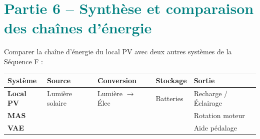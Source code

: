 \documentclass[a4paper, 11pt, oneside]{article}
\begin{document}
\newpage

\section{\textcolor{teal}{Partie 6 -- Synthèse et comparaison des chaînes d'énergie}}

Comparer la chaîne d'énergie du local PV avec deux autres systèmes de la Séquence F :

\vspace{0.6cm}

\begin{tcolorbox}[colback=grisclair, colframe=bleucol, title=\textcolor{bleucol}{\textbf{Tableau comparatif}}]
\small
\renewcommand{\arraystretch}{1.6}
\begin{tabular}{|p{2.2cm}|p{2.5cm}|p{2.5cm}|p{2cm}|p{2.5cm}|}
\hline
\textbf{Système} & \textbf{Source} & \textbf{Conversion} & \textbf{Stockage} & \textbf{Sortie} \\
\hline
\textbf{Local PV} & Lumière solaire & Lumière $\rightarrow$ Élec & Batteries & Recharge / Éclairage \\
\hline
\textbf{MAS} & \underline{\hspace{1.8cm}} & \underline{\hspace{1.8cm}} & \underline{\hspace{1.8cm}} & Rotation moteur \\[10pt]
\hline
\textbf{VAE} & \underline{\hspace{1.8cm}} & \underline{\hspace{1.8cm}} & \underline{\hspace{1.8cm}} & Aide pédalage \\[10pt]
\hline
\end{tabular}
\end{tcolorbox}

\vspace{1cm}
\end{document}
